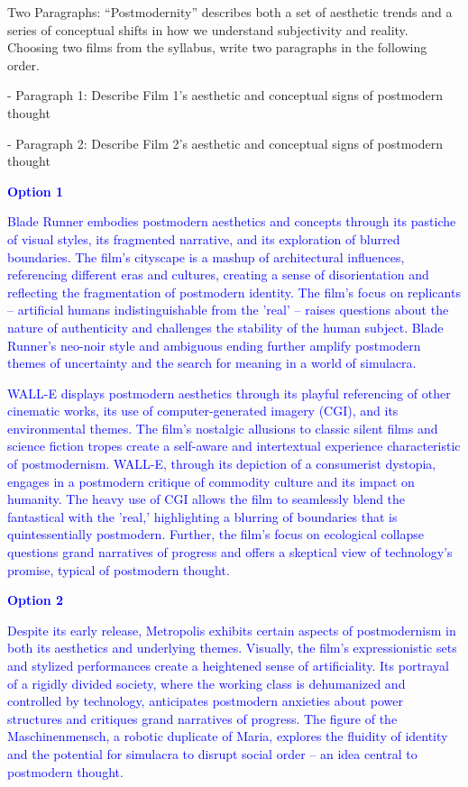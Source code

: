\documentclass[11pt,fleqn]{book} %
\begin{document}
\begin{exercise}
    Two Paragraphs: “Postmodernity” describes both a set of aesthetic trends and a series of conceptual shifts in how we understand subjectivity and reality. Choosing two films from the syllabus, write two paragraphs in the following order.

- Paragraph 1: Describe Film 1’s aesthetic and conceptual signs of postmodern thought

- Paragraph 2: Describe Film 2’s aesthetic and conceptual signs of postmodern thought

    \textcolor{blue}{
\textbf{Option 1}
}

    \textcolor{blue}{
Blade Runner embodies postmodern aesthetics and concepts through its pastiche of visual styles, its fragmented narrative, and its exploration of blurred boundaries. The film's cityscape is a mashup of architectural influences, referencing different eras and cultures, creating a sense of disorientation and reflecting the fragmentation of postmodern identity. The film's focus on replicants – artificial humans indistinguishable from the 'real' –  raises questions about the nature of authenticity and challenges the stability of the human subject. Blade Runner's neo-noir style and ambiguous ending further amplify postmodern themes of uncertainty and the search for meaning in a world of simulacra.
}

    \textcolor{blue}{
WALL-E displays postmodern aesthetics through its playful referencing of other cinematic works, its use of computer-generated imagery (CGI), and its environmental themes. The film's nostalgic allusions to classic silent films and science fiction tropes create a self-aware and intertextual experience characteristic of postmodernism.  WALL-E, through its depiction of a consumerist dystopia, engages in a postmodern critique of commodity culture and its impact on humanity.  The heavy use of CGI allows the film to seamlessly blend the fantastical with the 'real,' highlighting a blurring of boundaries that is quintessentially postmodern. Further, the film's focus on ecological collapse questions grand narratives of progress and offers a skeptical view of technology's promise, typical of postmodern thought.
}

    \textcolor{blue}{
\textbf{Option 2}
}

    \textcolor{blue}{
Despite its early release, Metropolis exhibits certain aspects of postmodernism in both its aesthetics and underlying themes. Visually, the film's expressionistic sets and stylized performances create a heightened sense of artificiality. Its portrayal of a rigidly divided society, where the working class is dehumanized and controlled by technology, anticipates postmodern anxieties about power structures and critiques grand narratives of progress.  The figure of the Maschinenmensch, a robotic duplicate of Maria,  explores the fluidity of identity and the potential for simulacra to disrupt social order – an idea central to postmodern thought.
}


\end{exercise}
\end{document}
